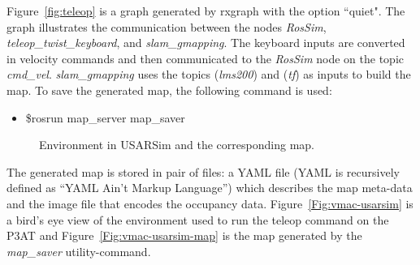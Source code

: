 Figure~\ref{fig:teleop} is a graph generated by rxgraph with the option ``quiet". The graph illustrates the communication between the nodes {\it RosSim}, {\it teleop\_twist\_keyboard}, and {\it slam\_gmapping}. The keyboard inputs are converted in velocity commands and then communicated to the {\it RosSim} node on the topic {\it cmd\_vel}. {\it slam\_gmapping} uses the topics ({\it lms200}) and ({\it tf}) as inputs to build the map. To save the generated map, the following command is used:

\begin{itemize}
\item[]\$rosrun map\_server map\_saver
\end{itemize}

\begin{figure}[t!]
\centering
{}\qquad
{}
\caption{Environment in USARSim and the corresponding map.}
\end{figure}
The generated map is stored in pair of files: a YAML file (YAML is recursively defined as ``YAML Ain't Markup Language'') which describes the map meta-data and the image file that encodes the occupancy data. Figure~\ref{Fig:vmac-usarsim} is a bird's eye view of the environment used to run the teleop command on the P3AT and Figure~\ref{Fig:vmac-usarsim-map} is the map generated by the {\it map\_saver} utility-command.






